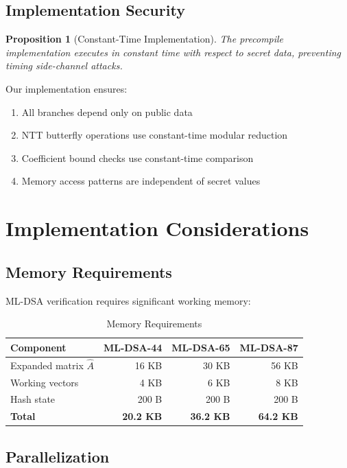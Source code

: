 \documentclass[11pt,a4paper]{article}
\newtheorem{proposition}{Proposition}
\begin{document}
\subsection{Implementation Security}

\begin{proposition}[Constant-Time Implementation]
The precompile implementation executes in constant time with respect to secret data, preventing timing side-channel attacks.
\end{proposition}

Our implementation ensures:
\begin{enumerate}
    \item All branches depend only on public data
    \item NTT butterfly operations use constant-time modular reduction
    \item Coefficient bound checks use constant-time comparison
    \item Memory access patterns are independent of secret values
\end{enumerate}

\section{Implementation Considerations}

\subsection{Memory Requirements}

ML-DSA verification requires significant working memory:

\begin{table}[htbp]
\centering
\caption{Memory Requirements}
\label{tab:memory}
\begin{tabular}{@{}lrrr@{}}
\toprule
Component & ML-DSA-44 & ML-DSA-65 & ML-DSA-87 \\
\midrule
Expanded matrix $\hat{A}$ & 16 KB & 30 KB & 56 KB \\
Working vectors & 4 KB & 6 KB & 8 KB \\
Hash state & 200 B & 200 B & 200 B \\
\textbf{Total} & \textbf{20.2 KB} & \textbf{36.2 KB} & \textbf{64.2 KB} \\
\bottomrule
\end{tabular}
\end{table}

\subsection{Parallelization}
\end{document}
